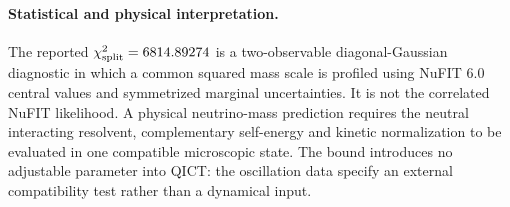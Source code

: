 \paragraph{Statistical and physical interpretation.}
The reported $\chi^2_{\rm split}=6814.89274$ is a two-observable
diagonal-Gaussian diagnostic in which a common squared mass scale is
profiled using NuFIT 6.0 central values and symmetrized marginal
uncertainties. It is not the correlated NuFIT likelihood.
A physical neutrino-mass prediction requires the neutral interacting
resolvent, complementary self-energy and kinetic normalization to be
evaluated in one compatible microscopic state. The bound introduces no
adjustable parameter into QICT: the oscillation data specify an external
compatibility test rather than a dynamical input.
